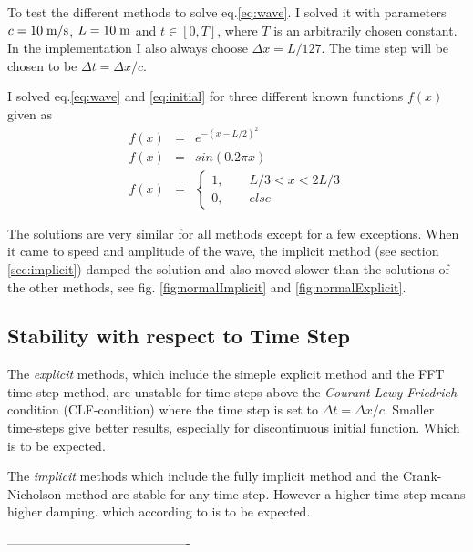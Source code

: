 To test the different methods to solve eq.\eqref{eq:wave}. I solved it with parameters $c = 10\;\rm{m/s}$, $L = 10\;\rm{m}$ and $t \in [0, T]$, where $T$ is an arbitrarily chosen constant.
In the implementation I also always choose $\Delta x = L/127$. The time step will be chosen to be $\Delta t = \Delta x/c$.

I solved eq.\eqref{eq:wave} and \eqref{eq:initial} for three different known functions $f(x)$ given as
\begin{eqnarray}
	f(x) & = &e^{-(x-L/2)^2} \label{eq:initNormal}\\
	f(x) & = &sin(0.2 \pi x) \label{eq:initSine}\\
	f(x) & = &\begin{cases}
				1, \qquad L/3 < x < 2 L/3 \\
				0, \qquad else
			\end{cases}\label{eq:initDiscont}
\end{eqnarray}

The solutions are very similar for all methods except for a few exceptions.
When it came to speed and amplitude of the wave, the implicit method (see section \ref{sec:implicit}) damped the solution and also moved slower than the solutions of the other methods, see fig. \ref{fig:normalImplicit} and \ref{fig:normalExplicit}. 

\subsection{Stability with respect to Time Step}
The \emph{explicit} methods, which include the simeple explicit method and the FFT time step method, are unstable for time steps above the \emph{Courant-Lewy-Friedrich} condition (CLF-condition)
where the time step is set to $\Delta t = \Delta x/c$. Smaller time-steps give better results, especially for discontinuous initial function. Which is to be expected.

The \emph{implicit} methods which include the fully implicit method and the Crank-Nicholson method
are stable for any time step. However a higher time step means higher damping. which according to \cite{FDNotes} is to be expected.

%
-------------------------------------------


